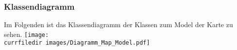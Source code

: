 \begin{samepage}
    \subsubsection{Klassendiagramm}\label{App_Map_Model_Klassendiagramm}
    Im Folgenden ist das Klassendiagramm der Klassen zum Model der Karte zu sehen.
    \texttt{[image: \\currfiledir images/Diagramm\_Map\_Model.pdf]}
    
\end{samepage}
